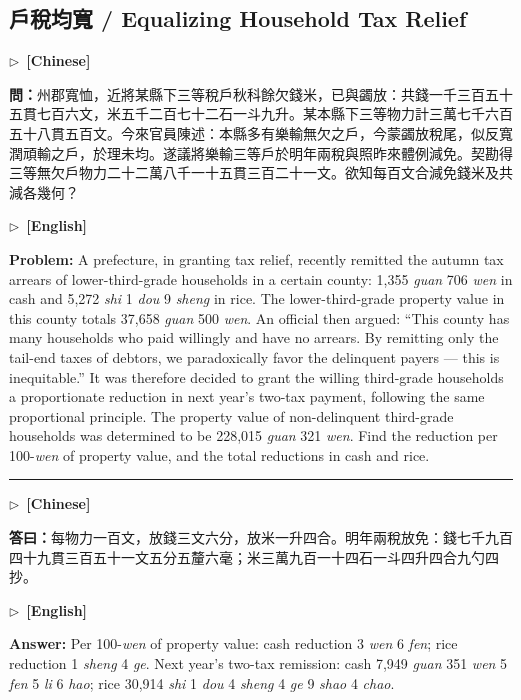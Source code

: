 \documentclass[10pt,a4paper]{article}
\newcommand{\longline}{\par\noindent\rule{\textwidth}{0.4pt}\par}
\newcommand{\CNmarker}{\noindent\textcolor{cnlabel}{$\triangleright$\ \textbf{[Chinese]}}\par}
\newcommand{\ENmarker}{\noindent\textcolor{enlabel}{$\triangleright$\ \textbf{[English]}}\par}
\newcommand{\Question}[1]{\par\noindent\textbf{\color{problemcolor}問：}#1\par}
\newcommand{\Answer}[1]{\par\noindent\textbf{\color{answercolor}答曰：}#1\par}
\newcommand{\QuestionEn}[1]{\par\noindent\textbf{\color{problemcolor}Problem:} #1\par}
\newcommand{\AnswerEn}[1]{\par\noindent\textbf{\color{answercolor}Answer:} #1\par}
\begin{document}
\newpage
\subsection*{戶稅均寬 / Equalizing Household Tax Relief}

\CNmarker
\Question{州郡寬恤，近將某縣下三等稅戶秋科餘欠錢米，已與蠲放：共錢一千三百五十五貫七百六文，米五千二百七十二石一斗九升。某本縣下三等物力計三萬七千六百五十八貫五百文。今來官員陳述：本縣多有樂輸無欠之戶，今蒙蠲放稅尾，似反寬潤頑輸之戶，於理未均。遂議將樂輸三等戶於明年兩稅與照昨來體例減免。契勘得三等無欠戶物力二十二萬八千一十五貫三百二十一文。欲知每百文合減免錢米及共減各幾何？}

\ENmarker
\QuestionEn{A prefecture, in granting tax relief, recently remitted the autumn tax arrears of lower-third-grade households in a certain county: 1,355 \textit{guan} 706 \textit{wen} in cash and 5,272 \textit{shi} 1 \textit{dou} 9 \textit{sheng} in rice. The lower-third-grade property value in this county totals 37,658 \textit{guan} 500 \textit{wen}. An official then argued: ``This county has many households who paid willingly and have no arrears. By remitting only the tail-end taxes of debtors, we paradoxically favor the delinquent payers --- this is inequitable.'' It was therefore decided to grant the willing third-grade households a proportionate reduction in next year's two-tax payment, following the same proportional principle. The property value of non-delinquent third-grade households was determined to be 228,015 \textit{guan} 321 \textit{wen}. Find the reduction per 100-\textit{wen} of property value, and the total reductions in cash and rice.}

\longline

\CNmarker
\Answer{每物力一百文，放錢三文六分，放米一升四合。明年兩稅放免：錢七千九百四十九貫三百五十一文五分五釐六毫；米三萬九百一十四石一斗四升四合九勺四抄。}

\ENmarker
\AnswerEn{Per 100-\textit{wen} of property value: cash reduction 3 \textit{wen} 6 \textit{fen}; rice reduction 1 \textit{sheng} 4 \textit{ge}. Next year's two-tax remission: cash 7,949 \textit{guan} 351 \textit{wen} 5 \textit{fen} 5 \textit{li} 6 \textit{hao}; rice 30,914 \textit{shi} 1 \textit{dou} 4 \textit{sheng} 4 \textit{ge} 9 \textit{shao} 4 \textit{chao}.}
\end{document}
